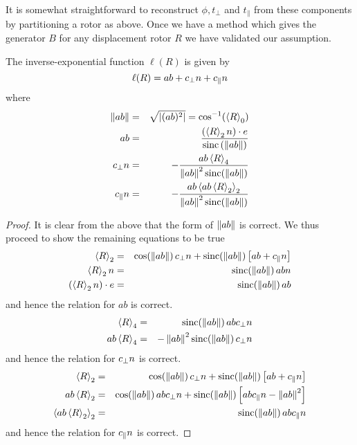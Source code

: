 It is somewhat straightforward to reconstruct $\phi, t_\perp$ and $t_\parallel$ from these
components by partitioning a rotor as above. Once we have a method which gives the
generator $B$ for any displacement rotor $R$ we have validated our assumption.

\begin{thm}
The inverse-exponential function $\ell(R)$ is given by
\[
\ell(R) = ab + c_\perp n + c_\parallel n
\]
where
\begin{eqnarray*}
\left\Vert ab \right\Vert & = & \sqrt{\left| (ab)^2 \right|}  = \cos^{-1}(\left<R\right>_0) \\
ab & = & \frac{\left(\left<R\right>_2 n \right) \cdot e}
{\mathrm{sinc}\left(\left\Vert ab \right\Vert\right)}\\
c_\perp n & = & - \frac{ab \left<R\right>_4}
{\left\Vert ab \right\Vert^2\mathrm{sinc}(\left\Vert ab \right\Vert)} \\
c_\parallel n & = & - \frac{ab \left<ab \left<R\right>_2\right>_2}
{\left\Vert ab \right\Vert^2\mathrm{sinc}(\left\Vert ab \right\Vert)}
\end{eqnarray*}
\end{thm}
\begin{proof}
It is clear from the above that the form of
$\left\Vert ab \right\Vert$ is correct. We thus proceed to show the remaining
equations to be true
\begin{eqnarray*}
\left<R\right>_2 & = & \cos(\left\Vert ab \right\Vert) \, c_\perp n +
\mathrm{sinc}(\left\Vert ab \right\Vert) \left[ab + c_\parallel n\right]\\
\left<R\right>_2 n & = & \mathrm{sinc}(\left\Vert ab \right\Vert) \, abn\\
\left(\left<R\right>_2 n\right) \cdot e & = & \mathrm{sinc}(\left\Vert ab \right\Vert) \, ab
\end{eqnarray*}
and hence the relation for $ab$ is correct.
\begin{eqnarray*}
\left<R\right>_4 & = & \mathrm{sinc}(\left\Vert ab \right\Vert) \, abc_\perp n \\
ab \left<R\right>_4 & = & -\left\Vert ab \right\Vert^2 \mathrm{sinc}(\left\Vert ab \right\Vert) \, c_\perp n 
\end{eqnarray*}
and hence the relation for $c_\perp n$ is correct.
\begin{eqnarray*}
\left<R\right>_2 & = & \cos(\left\Vert ab \right\Vert) \, c_\perp n +
\mathrm{sinc}(\left\Vert ab \right\Vert) \left[ab + c_\parallel n\right]\\
ab \left<R\right>_2 & = & \cos(\left\Vert ab \right\Vert) \, abc_\perp n +
\mathrm{sinc}(\left\Vert ab \right\Vert) \left[ab c_\parallel n - \left\Vert ab \right\Vert^2\right]\\
\left<ab \left<R\right>_2\right>_2 & = & 
\mathrm{sinc}(\left\Vert ab \right\Vert) \, ab c_\parallel n
\end{eqnarray*}
and hence the relation for $c_\parallel n$ is correct.
\end{proof}


